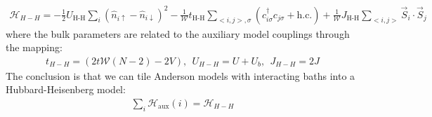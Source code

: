 \documentclass[prb]{revtex4-2}
\begin{document}
\begin{equation}\begin{aligned}
	\mathcal{H}_{H-H} = - \frac{1}{2}U_\text{H-H}\sum_{i} \left(\hat n_{i \uparrow} - \hat n_{i \downarrow} \right)^2 - \frac{1}{\mathcal{W}}t_\text{H-H}\sum_{<i,j>,\sigma}\left(c^\dagger_{i\sigma}c_{j\sigma} + \text{h.c.}\right) + \frac{1}{\mathcal{W}}J_\text{H-H}\sum_{<i,j>} \vec{S}_i\cdot\vec{S}_j
\end{aligned}\end{equation}
where the bulk parameters are related to the auxiliary model couplings through the mapping:
\begin{equation}\begin{aligned}
	\label{map_aux_bulk}
	t_{H-H} = \left(2t \mathcal{W}(N-2) - 2V\right),~ ~ U_{H-H} = U + U_b, ~ ~ J_{H-H} = 2J
\end{aligned}\end{equation}
The conclusion is that we can tile Anderson models with interacting baths into a Hubbard-Heisenberg model:
\begin{equation}\begin{aligned}
	\label{siam_to_hubb}
	\sum_i \mathcal{H}_\text{aux}(i) = \mathcal{H}_{H-H}
\end{aligned}\end{equation}
\end{document}
